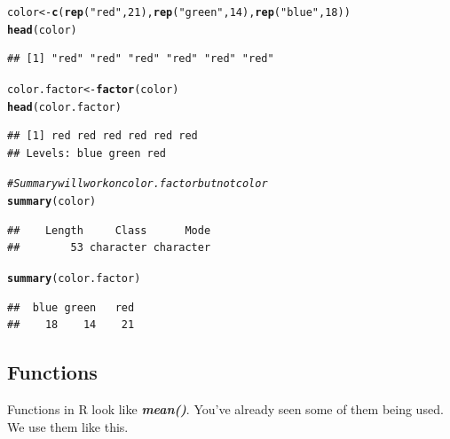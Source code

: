 \documentclass{article}\usepackage[]{graphicx}\usepackage[]{color}
\makeatletter
\newcommand{\hlnum}[1]{\textcolor[rgb]{0.686,0.059,0.569}{#1}}%
\newcommand{\hlstr}[1]{\textcolor[rgb]{0.192,0.494,0.8}{#1}}%
\newcommand{\hlcom}[1]{\textcolor[rgb]{0.678,0.584,0.686}{\textit{#1}}}%
\newcommand{\hlstd}[1]{\textcolor[rgb]{0.345,0.345,0.345}{#1}}%
\newcommand{\hlkwb}[1]{\textcolor[rgb]{0.69,0.353,0.396}{#1}}%
\newcommand{\hlkwd}[1]{\textcolor[rgb]{0.737,0.353,0.396}{\textbf{#1}}}%
\newenvironment{kframe}{%
 \def\at@end@of@kframe{}%
 \ifinner\ifhmode%
  \def\at@end@of@kframe{\end{minipage}}%
  \begin{minipage}{\columnwidth}%
 \fi\fi%
 \def\FrameCommand##1{\hskip\@totalleftmargin \hskip-\fboxsep
 \colorbox{shadecolor}{##1}\hskip-\fboxsep
     \hskip-\linewidth \hskip-\@totalleftmargin \hskip\columnwidth}%
 \MakeFramed {\advance\hsize-\width
   \@totalleftmargin\z@ \linewidth\hsize
   \@setminipage}}%
 {\par\unskip\endMakeFramed%
 \at@end@of@kframe}
\newenvironment{knitrout}{}{} %
\makeatother
\begin{document}
\begin{knitrout}
\color{fgcolor}\begin{kframe}
\begin{alltt}
  \hlstd{color} \hlkwb{<-} \hlkwd{c}\hlstd{(}\hlkwd{rep}\hlstd{(}\hlstr{"red"}\hlstd{,} \hlnum{21}\hlstd{),} \hlkwd{rep}\hlstd{(}\hlstr{"green"}\hlstd{,} \hlnum{14}\hlstd{),} \hlkwd{rep}\hlstd{(}\hlstr{"blue"}\hlstd{,} \hlnum{18}\hlstd{))}
  \hlkwd{head}\hlstd{(color)}
\end{alltt}
\begin{verbatim}
## [1] "red" "red" "red" "red" "red" "red"
\end{verbatim}
\begin{alltt}
  \hlstd{color.factor} \hlkwb{<-} \hlkwd{factor}\hlstd{(color)}
  \hlkwd{head}\hlstd{(color.factor)}
\end{alltt}
\begin{verbatim}
## [1] red red red red red red
## Levels: blue green red
\end{verbatim}
\begin{alltt}
  \hlcom{# Summary will work on color.factor but not color}
  \hlkwd{summary}\hlstd{(color)}
\end{alltt}
\begin{verbatim}
##    Length     Class      Mode 
##        53 character character
\end{verbatim}
\begin{alltt}
  \hlkwd{summary}\hlstd{(color.factor)}
\end{alltt}
\begin{verbatim}
##  blue green   red 
##    18    14    21
\end{verbatim}
\end{kframe}
\end{knitrout}
    
    
  \subsection*{Functions}
  Functions in R look like \textbf{\textit{mean()}}. You've already seen some 
  of them being used. We use them like this.
  
\end{document}
